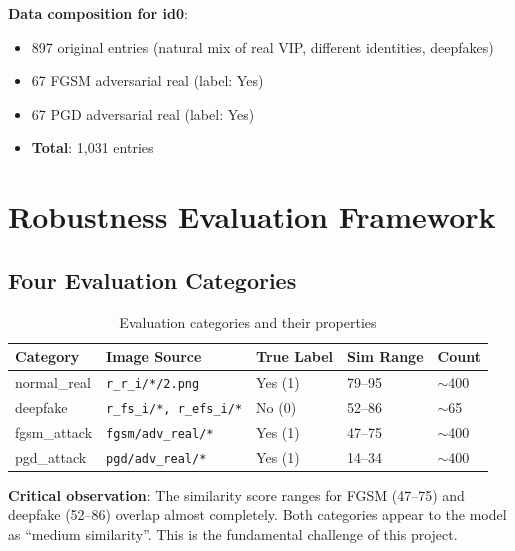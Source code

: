 \documentclass[12pt,a4paper]{article}
\begin{document}
\textbf{Data composition for id0}:
\begin{itemize}
    \item 897 original entries (natural mix of real VIP, different identities, deepfakes)
    \item 67 FGSM adversarial real (label: Yes)
    \item 67 PGD adversarial real (label: Yes)
    \item \textbf{Total}: 1,031 entries
\end{itemize}

\section{Robustness Evaluation Framework}

\subsection{Four Evaluation Categories}

\begin{table}[H]
\centering
\caption{Evaluation categories and their properties}
\begin{tabular}{@{}lllll@{}}
\toprule
\textbf{Category} & \textbf{Image Source} & \textbf{True Label} & \textbf{Sim Range} & \textbf{Count} \\
\midrule
normal\_real  & \texttt{r\_r\_i/*/2.png}         & Yes (1) & 79--95  & $\sim$400 \\
deepfake      & \texttt{r\_fs\_i/*, r\_efs\_i/*}  & No  (0) & 52--86  & $\sim$65  \\
fgsm\_attack  & \texttt{fgsm/adv\_real/*}         & Yes (1) & 47--75  & $\sim$400 \\
pgd\_attack   & \texttt{pgd/adv\_real/*}          & Yes (1) & 14--34  & $\sim$400 \\
\bottomrule
\end{tabular}
\end{table}

\begin{warnbox}
\textbf{Critical observation}: The similarity score ranges for FGSM (47--75) and deepfake (52--86) overlap almost completely. Both categories appear to the model as ``medium similarity''. This is the fundamental challenge of this project.
\end{warnbox}
\end{document}
